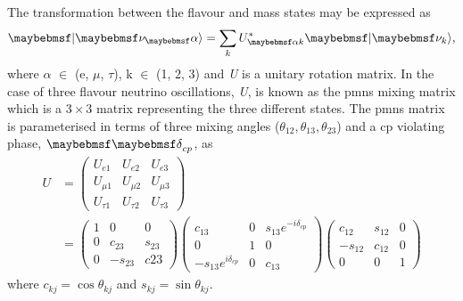 The transformation between the flavour and mass states may be expressed as
\begin{equation}\label{eqn:state transformation}
    \ket{\nu_\alpha} = \sum_k U^*_{\alpha k} \ket{\nu_k},
\end{equation}
where $\alpha$ $\in$ (e, $\mu$, $\tau$), k $\in$ (1, 2, 3) and \textit{U} is a unitary rotation matrix. In the case of three flavour neutrino oscillations, \textit{U}, is known as the \gls{pmns} mixing matrix which is a $3 \times 3$ matrix representing the three different states. The \gls{pmns} matrix is parameterised in terms of three mixing angles ($\theta_{12}, \theta_{13}, \theta_{23}$) and a \gls{cp} violating phase, \textit{$\Kronecker_{cp}$}, as
\begin{equation}
\begin{split}
U &= 
\begin{pmatrix}
U_{e1} & U_{e2} & U_{e3} \\
U_{\mu1} & U_{\mu2} & U_{\mu3}  \\
U_{\tau1} & U_{\tau2} & U_{\tau3}
\end{pmatrix} \\
&=
\begin{pmatrix}
1 & 0 & 0 \\
0 & c_{23} & s_{23}  \\
0 & -s_{23} & c{23}
\end{pmatrix}
\begin{pmatrix}
c_{13} & 0 & s_{13}e^{-i\delta_{cp}} \\
0 & 1 & 0  \\
-s_{13}e^{i\delta_{cp}} & 0 & c_{13}
\end{pmatrix}
\begin{pmatrix}
c_{12} & s_{12} & 0 \\
-s_{12} & c_{12} & 0  \\
0 & 0 & 1
\end{pmatrix}
\end{split}
\end{equation}
where $c_{kj} = \cos{\theta_{kj}}$ and $s_{kj} = \sin{\theta_{kj}}$.

